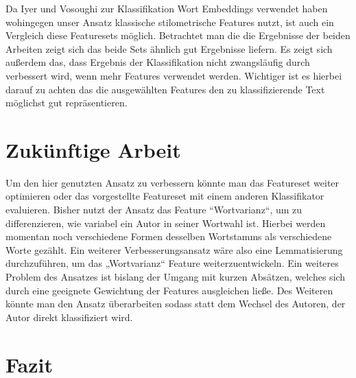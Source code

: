 \documentclass[conference]{IEEEtran}
\begin{document}
	Da Iyer und Vosoughi zur Klassifikation Wort Embeddings verwendet haben wohingegen unser Ansatz klassische stilometrische Features nutzt, ist auch ein Vergleich diese Featuresets möglich. Betrachtet man die die Ergebnisse der beiden Arbeiten zeigt sich das beide Sets ähnlich gut Ergebnisse liefern. Es zeigt sich außerdem das, dass Ergebnis der Klassifikation nicht zwangsläufig durch verbessert wird, wenn mehr Features verwendet werden. Wichtiger ist es hierbei darauf zu achten das die ausgewählten Features den zu klassifizierende Text möglichst gut repräsentieren.
	
	\section{Zukünftige Arbeit}
	Um den hier genutzten Ansatz zu verbessern könnte man das Featureset weiter optimieren oder das vorgestellte Featureset mit einem anderen Klassifikator evaluieren. Bisher nutzt der Ansatz das Feature “Wortvarianz“, um zu differenzieren, wie variabel ein Autor in seiner Wortwahl ist. Hierbei werden momentan noch verschiedene Formen desselben Wortstamms als verschiedene Worte gezählt. Ein weiterer Verbesserungsansatz wäre also eine Lemmatisierung durchzuführen, um das „Wortvarianz“ Feature weiterzuentwickeln. Ein weiteres Problem des Ansatzes ist bislang der Umgang mit kurzen Absätzen, welches sich durch eine geeignete Gewichtung der Features ausgleichen ließe. Des Weiteren könnte man den Ansatz überarbeiten sodass statt dem Wechsel des Autoren, der Autor direkt klassifiziert wird.
	
\section{Fazit}
\end{document}
